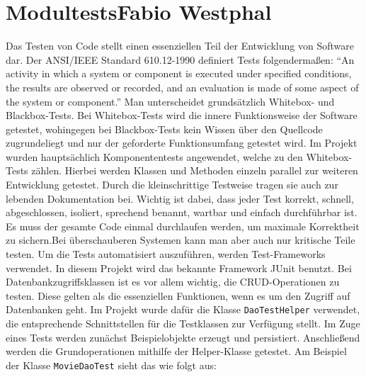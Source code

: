 	\section[Modultests]{Modultests{\hfill \normalsize Fabio Westphal}}
	Das Testen von Code stellt einen essenziellen Teil der Entwicklung von Software dar. Der ANSI/IEEE Standard 610.12-1990 definiert Tests folgendermaßen:	\enquote {An activity in which a system or component is executed under specified conditions, the results are observed or recorded, and an evaluation is made of some aspect of the system or component.} Man unterscheidet grundsätzlich Whitebox- und Blackbox-Tests. Bei Whitebox-Tests wird die innere Funktionsweise der Software getestet, wohingegen bei Blackbox-Tests kein Wissen über den Quellcode zugrundeliegt und nur der geforderte Funktionsumfang getestet wird.\autocite[Vgl.][S.28]{franz2007handbuch} Im Projekt wurden hauptsächlich Komponententests angewendet, welche zu den Whitebox-Tests zählen. Hierbei werden Klassen und Methoden einzeln parallel zur weiteren Entwicklung getestet. Durch die kleinschrittige Testweise tragen sie auch zur lebenden Dokumentation bei. Wichtig ist dabei, dass jeder Test korrekt,
schnell, abgeschlossen,	isoliert, sprechend benannt, wartbar und einfach durchführbar
ist.
	Es muss der gesamte Code einmal durchlaufen werden, um maximale Korrektheit zu sichern.\autocite[Vgl.][S.50] {witte2015testmanagement}Bei überschauberen Systemen kann man aber auch nur kritische Teile testen. Um die Tests automatisiert auszuführen, werden Test-Frameworks verwendet. In diesem Projekt wird das bekannte Framework JUnit benutzt.
	Bei Datenbankzugriffsklassen ist es vor allem wichtig, die \ac{CRUD}-Operationen zu testen. Diese gelten als die essenziellen Funktionen, wenn es um den Zugriff auf Datenbanken geht. Im Projekt wurde dafür die Klasse \texttt{DaoTestHelper} verwendet, die entsprechende Schnittstellen für die Testklassen zur Verfügung stellt. Im Zuge eines Tests werden zunächst Beispielobjekte erzeugt und persistiert. Anschließend werden die Grundoperationen mithilfe der Helper-Klasse getestet. Am Beispiel der Klasse \texttt{MovieDaoTest} sieht das wie folgt aus:

